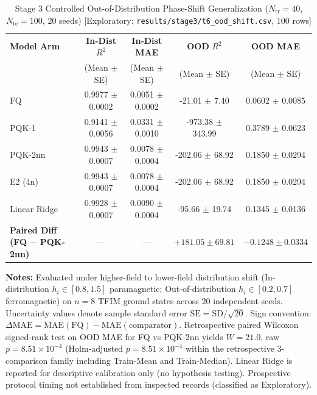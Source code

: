 \begin{table}[!t]
\caption{Stage 3 Controlled Out-of-Distribution Phase-Shift Generalization ($N_{\mathrm{tr}}=40$, $N_{\mathrm{te}}=100$, 20 seeds) [Exploratory: \texttt{results/stage3/t6\_ood\_shift.csv}, 100 rows]}
\label{tab:ood}
\centering
\begingroup
\small
\setlength{\tabcolsep}{5pt}
\begin{tabular}{@{}lcccc@{}}
\toprule
\textbf{Model Arm} & \textbf{In-Dist} $R^2$ & \textbf{In-Dist MAE} & \textbf{OOD} $R^2$ & \textbf{OOD MAE} \\
 & (Mean $\pm$ SE) & (Mean $\pm$ SE) & (Mean $\pm$ SE) & (Mean $\pm$ SE) \\
\midrule
FQ & 0.9977 $\pm$ 0.0002 & 0.0051 $\pm$ 0.0002 & -21.01 $\pm$ 7.40 & 0.0602 $\pm$ 0.0085 \\
PQK-1 & 0.9141 $\pm$ 0.0056 & 0.0331 $\pm$ 0.0010 & -973.38 $\pm$ 343.99 & 0.3789 $\pm$ 0.0623 \\
PQK-2nn & 0.9943 $\pm$ 0.0007 & 0.0078 $\pm$ 0.0004 & -202.06 $\pm$ 68.92 & 0.1850 $\pm$ 0.0294 \\
E2 (4n) & 0.9943 $\pm$ 0.0007 & 0.0078 $\pm$ 0.0004 & -202.06 $\pm$ 68.92 & 0.1850 $\pm$ 0.0294 \\
Linear Ridge & 0.9928 $\pm$ 0.0007 & 0.0090 $\pm$ 0.0004 & -95.66 $\pm$ 19.74 & 0.1345 $\pm$ 0.0136 \\
\midrule
\textbf{Paired Diff (FQ $-$ PQK-2nn)} & --- & --- & $+181.05 \pm 69.81$ & $-0.1248 \pm 0.0334$ \\
\bottomrule
\end{tabular}
\endgroup
\vspace{1ex}
{\raggedright \footnotesize \textbf{Notes:} Evaluated under higher-field to lower-field distribution shift (In-distribution $h_i \in [0.8, 1.5]$ paramagnetic; Out-of-distribution $h_i \in [0.2, 0.7]$ ferromagnetic) on $n=8$ TFIM ground states across 20 independent seeds. Uncertainty values denote sample standard error $\mathrm{SE} = \mathrm{SD}/\sqrt{20}$. Sign convention: $\Delta\mathrm{MAE} = \mathrm{MAE}(\mathrm{FQ}) - \mathrm{MAE}(\mathrm{comparator})$. Retrospective paired Wilcoxon signed-rank test on OOD MAE for FQ vs PQK-2nn yields $W=21.0$, raw $p=8.51\times 10^{-4}$ (Holm-adjusted $p=8.51\times 10^{-4}$ within the retrospective 3-comparison family including Train-Mean and Train-Median). Linear Ridge is reported for descriptive calibration only (no hypothesis testing). Prospective protocol timing not established from inspected records (classified as Exploratory).\par}
\end{table}
